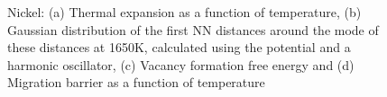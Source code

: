 \documentclass{article}
\begin{document}
\begin{figure}[!htp]
\centering
{}
\hfill
{}
\hfill
\caption{Nickel: (a) Thermal expansion as a function of temperature, (b) Gaussian distribution of the first NN distances around the mode of these distances at 1650K, calculated using the potential \cite{Mishin2004} and a harmonic oscillator, (c) Vacancy formation free energy and (d) Migration barrier as a function of temperature}
\label{fig:11}
\end{figure}
\end{document}
